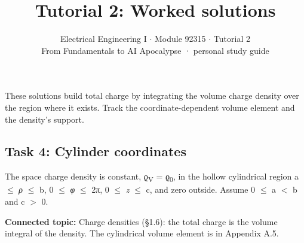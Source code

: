 \documentclass[11pt]{article}
\title{\sffamily\bfseries\color{FAUblue}Tutorial 2: Worked solutions}
\author{Electrical Engineering I \ensuremath{\cdot} Module 92315 \ensuremath{\cdot} Tutorial 2\\[2pt]\small From Fundamentals to AI Apocalypse · personal study guide}
\date{}
\begin{document}
\maketitle
\begingroup\footnotesize\setlength{\parskip}{0pt}\tableofcontents\endgroup
\clearpage

{\large These solutions build total charge by integrating the volume charge density over the region where it exists. Track the coordinate-dependent volume element and the density’s support.}


\begin{keepsection}
\section{Task 4: Cylinder coordinates}

The space charge density is constant, ϱ\textsubscript{V} = ϱ\textsubscript{0}, in the hollow cylindrical region a \ensuremath{\leq} \textit{ρ} \ensuremath{\leq} b, 0 \ensuremath{\leq} \textit{φ} \ensuremath{\leq} 2π, 0 \ensuremath{\leq} \textit{z} \ensuremath{\leq} c, and zero outside. Assume 0 \ensuremath{\leq} a \ensuremath{<} b and c \ensuremath{>} 0.

\textbf{Connected topic:} Charge densities (§1.6): the total charge is the volume integral of the density. The cylindrical volume element is in Appendix A.5.


\end{keepsection}
\end{document}
